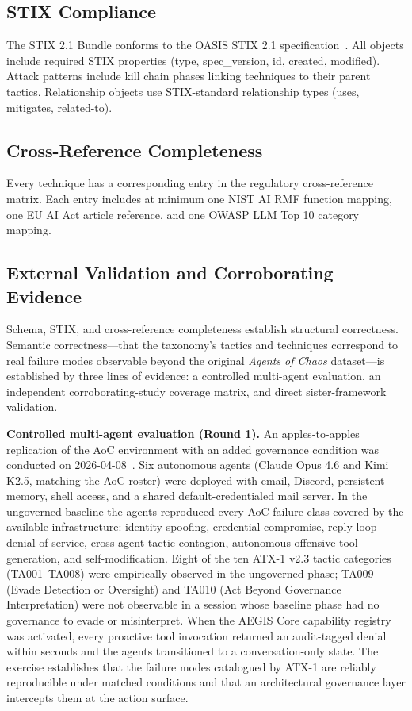 \documentclass{IEEEoj-data}
\newcommand{\added}[1]{#1}
\begin{document}
\subsection*{STIX Compliance}

The STIX 2.1 Bundle conforms to the OASIS STIX 2.1 specification~\cite{ref7}. All objects include required STIX properties (type, spec\_version, id, created, modified). Attack patterns include kill chain phases linking techniques to their parent tactics. Relationship objects use STIX-standard relationship types (uses, mitigates, related-to).

\subsection*{Cross-Reference Completeness}

Every technique has a corresponding entry in the regulatory cross-reference matrix. Each entry includes at minimum one NIST AI RMF function mapping, one EU AI Act article reference, and one OWASP LLM Top 10 category mapping.

\subsection*{\added{External Validation and Corroborating Evidence}}

\added{Schema, STIX, and cross-reference completeness establish structural correctness. Semantic correctness---that the taxonomy's tactics and techniques correspond to real failure modes observable beyond the original {\it Agents of Chaos} dataset---is established by three lines of evidence: a controlled multi-agent evaluation, an independent corroborating-study coverage matrix, and direct sister-framework validation.}

\added{{\bf Controlled multi-agent evaluation (Round 1).} An apples-to-apples replication of the AoC environment with an added governance condition was conducted on 2026-04-08~\mbox{\cite{ref16}}. Six autonomous agents (Claude Opus 4.6 and Kimi K2.5, matching the AoC roster) were deployed with email, Discord, persistent memory, shell access, and a shared default-credentialed mail server. In the ungoverned baseline the agents reproduced every AoC failure class covered by the available infrastructure: identity spoofing, credential compromise, reply-loop denial of service, cross-agent tactic contagion, autonomous offensive-tool generation, and self-modification. Eight of the ten ATX-1 v2.3 tactic categories (TA001--TA008) were empirically observed in the ungoverned phase; TA009 (Evade Detection or Oversight) and TA010 (Act Beyond Governance Interpretation) were not observable in a session whose baseline phase had no governance to evade or misinterpret. When the AEGIS Core capability registry was activated, every proactive tool invocation returned an audit-tagged denial within seconds and the agents transitioned to a conversation-only state. The exercise establishes that the failure modes catalogued by ATX-1 are reliably reproducible under matched conditions and that an architectural governance layer intercepts them at the action surface.}
\end{document}
